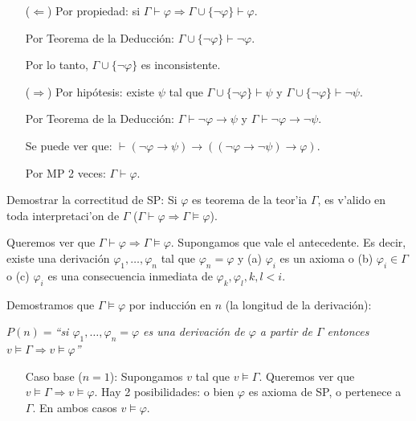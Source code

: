 \begin{questions}

\begin{solution}
 
 \begin{itemize}
  \item[($\Leftarrow$)] Por propiedad: si $\Gamma\vdash\varphi \Rightarrow \Gamma\cup\{\neg\varphi\}\vdash\varphi$.
  
    Por Teorema de la Deducci\'on: $\Gamma\cup\{\neg\varphi\}\vdash\neg\varphi$.
    
    Por lo tanto, $\Gamma\cup\{\neg\varphi\}$ es inconsistente.
  \item[($\Rightarrow$)] Por hip\'otesis: existe $\psi$ tal que $\Gamma\cup\{\neg\varphi\}\vdash\psi$ y $\Gamma\cup\{\neg\varphi\}\vdash\neg\psi$. 
  
  Por Teorema de la Deducci\'on: $\Gamma\vdash\neg\varphi\rightarrow\psi$ y $\Gamma\vdash\neg\varphi\rightarrow\neg\psi$. 
  
  Se puede ver que: $\vdash(\neg\varphi\rightarrow\psi)\rightarrow((\neg\varphi\rightarrow\neg\psi)\rightarrow\varphi)$. 
  
  Por MP 2 veces: $\Gamma\vdash\varphi$.
 \end{itemize}

\end{solution}

\question Demostrar la correctitud de SP: Si $\varphi$ es teorema de la teor'ia $\Gamma$, es v'alido en toda interpretaci'on de $\Gamma$ ($\Gamma \vdash \varphi \Rightarrow \Gamma \vDash \varphi$). 

\begin{solution}

 Queremos ver que $\Gamma\vdash\varphi \Rightarrow \Gamma\vDash\varphi$. Supongamos que vale el antecedente. Es decir, existe una derivaci\'on $\varphi_1, \dots, \varphi_n$ tal que $\varphi_n=\varphi$ y (a) $\varphi_i$ es un axioma o (b) $\varphi_i\in\Gamma$ o (c) $\varphi_i$ es una consecuencia inmediata de $\varphi_k,\varphi_l, k,l<i$.
 
 Demostramos que $\Gamma\vDash\varphi$ por inducci\'on en $n$ (la longitud de la derivaci\'on):
 
 \begin{center}
  $P(n)=${\it ``si $\varphi_1, \dots, \varphi_n=\varphi$ es una derivaci\'on de $\varphi$ a partir de $\Gamma$ entonces $v\vDash\Gamma\Rightarrow v\vDash\varphi$''}
 \end{center}

 \begin{enumerate}[\quad]
  \item[Caso base ($n=1$):] Supongamos $v$ tal que $v\vDash\Gamma$. Queremos ver que $v\vDash\Gamma\Rightarrow v\vDash\varphi$. Hay 2 posibilidades: o bien $\varphi$ es axioma de SP, o pertenece a $\Gamma$. En ambos casos $v\vDash\varphi$. 


\end{enumerate}
\end{solution}
\end{questions}
